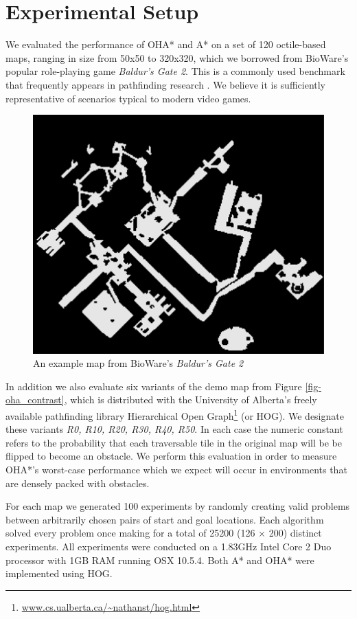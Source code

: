\section{Experimental Setup}
We evaluated the performance of OHA* and A* on a set of 120 octile-based maps, ranging in size from 50x50 
to 320x320, which we borrowed from BioWare's popular role-playing game \emph{Baldur's Gate 2}. 
This is a commonly used benchmark that frequently appears in pathfinding research 
\cite{botea04,bjornsson05,bjornsson06,sturtevant05,harabor08}.
We believe it is sufficiently representative of scenarios typical to modern video games. 
\begin{figure}[t]
       \begin{center}
                       \includegraphics[scale=0.50, trim = 10mm 10mm 10mm 0mm]{diagrams/bgmap.png}
       \end{center}
	\vspace{-3pt}
       \caption{An example map from BioWare's \emph{Baldur's Gate 2}}
       \label{fig-bgmap}
\end{figure}
In addition we also evaluate six variants of the demo map from Figure \ref{fig-oha_contrast},
 which is distributed with the University of Alberta's freely available pathfinding library 
Hierarchical Open Graph\footnote{\url{www.cs.ualberta.ca/~nathanst/hog.html}} (or HOG).
We designate these variants \emph{R0, R10, R20, R30, R40, R50}.
In each case the numeric constant refers to the probability that each traversable tile 
in the original map will be be flipped to become an obstacle.
We perform this evaluation in order to measure OHA*'s worst-case performance which we expect will occur in 
environments that are densely packed with obstacles.
\par
For each map we generated 100 experiments by randomly creating valid problems between arbitrarily chosen 
pairs of start and goal locations.
Each algorithm solved every problem once making for a total of 25200 (126 $\times$ 200) distinct experiments.
All experiments were conducted on a 1.83GHz Intel Core 2 Duo processor with 1GB RAM running OSX 10.5.4.
Both A* and OHA* were implemented using HOG. 
